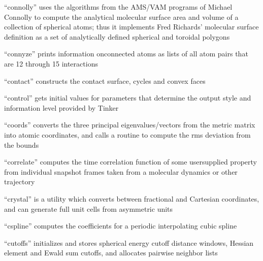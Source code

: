 \documentclass[letterpaper,11pt,english]{sphinxmanual}
\begin{document}

“connolly” uses the algorithms from the AMS/VAM programs of
Michael Connolly to compute the analytical molecular surface
area and volume of a collection of spherical atoms; thus
it implements Fred Richards’ molecular surface definition as
a set of analytically defined spherical and toroidal polygons


“connyze” prints information onconnected atoms as lists
of all atom pairs that are 1\sphinxhyphen{}2 through 1\sphinxhyphen{}5 interactions


“contact” constructs the contact surface, cycles and convex faces


“control” gets initial values for parameters that determine
the output style and information level provided by Tinker


“coords” converts the three principal eigenvalues/vectors from
the metric matrix into atomic coordinates, and calls a routine
to compute the rms deviation from the bounds


“correlate” computes the time correlation function of some
user\sphinxhyphen{}supplied property from individual snapshot frames taken
from a molecular dynamics or other trajectory






“crystal” is a utility which converts between fractional and
Cartesian coordinates, and can generate full unit cells from
asymmetric units


“cspline” computes the coefficients for a periodic interpolating
cubic spline


“cutoffs” initializes and stores spherical energy cutoff
distance windows, Hessian element and Ewald sum cutoffs,
and allocates pairwise neighbor lists
\end{document}
